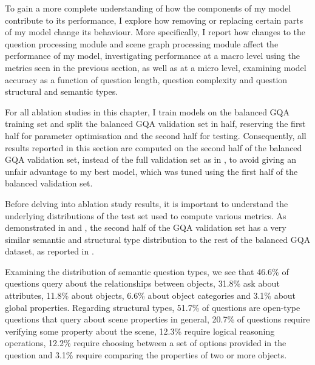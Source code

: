 To gain a more complete understanding of how the components of my model contribute to its performance, I explore how removing or replacing certain parts of my model change its behaviour. More specifically, I report how changes to the question processing module and scene graph processing module affect the performance of my model, investigating performance at a macro level using the metrics seen in the previous section, as well as at a micro level, examining model accuracy as a function of question length, question complexity and question structural and semantic types.  

For all ablation studies in this chapter, I train models on the balanced GQA training set and split the balanced GQA validation set in half, reserving the first half for parameter optimisation and the second half for testing. Consequently, all results reported in this section are computed on the second half of the balanced GQA validation set, instead of the full validation set as in \tableautorefname{ \ref{table:performance_comparison}}, to avoid giving an unfair advantage to my best model, which was tuned using the first half of the balanced validation set.

Before delving into ablation study results, it is important to understand the underlying distributions of the test set used to compute various metrics. As demonstrated in \tableautorefname{ \ref{tab:test_semantic_type_distribution}} and \tableautorefname{ \ref{tab:test_structural_type_distribution}}, the second half of the GQA validation set has a very similar semantic and structural type distribution to the rest of the balanced GQA dataset, as reported in \cite{hudson2019gqa_preprint}.

 Examining the distribution of semantic question types, we see that 46.6\% of questions query about the relationships between objects, 31.8\% ask about attributes, 11.8\% about objects, 6.6\% about object categories and 3.1\% about global properties. Regarding structural types, 51.7\% of questions are open-type questions that query about scene properties in general, 20.7\% of questions require verifying some property about the scene, 12.3\% require logical reasoning operations, 12.2\% require choosing between a set of options provided in the question and 3.1\% require comparing the properties of two or more objects.

